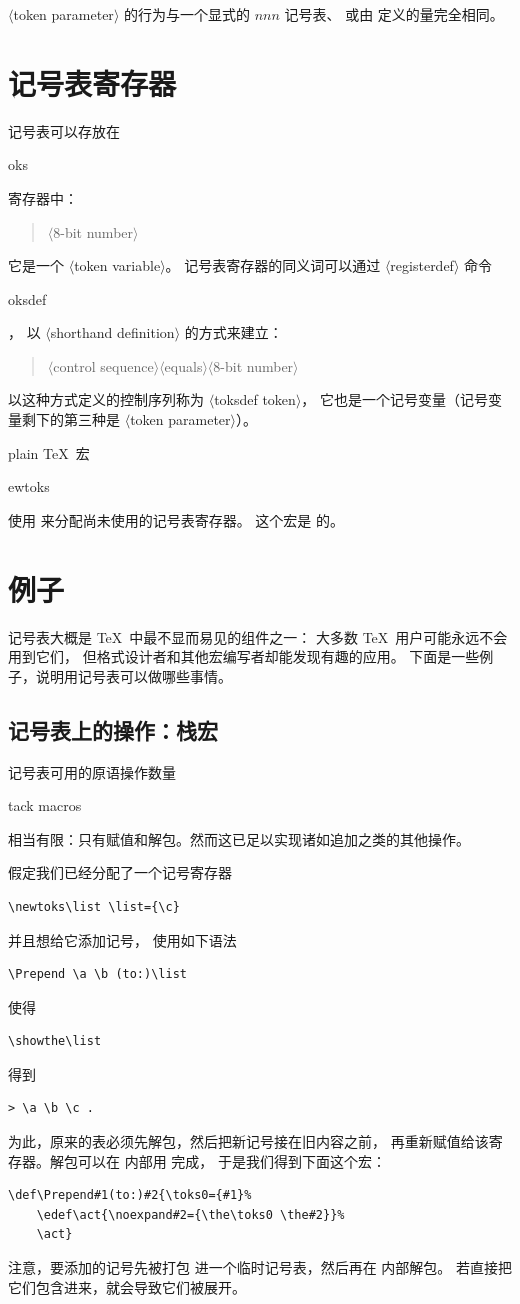 \documentclass[a4paper]{rapport3}
\makeatletter
\def\gr#1{$\langle$#1$\rangle$}\def\key#1{{\tt#1}}
\def\alt{}\def\altt{}%
\newenvironment{Disp}{\begin{quotation}}{\end{quotation}}
\def\howto#1\par{}
\def\cstoidx#1\par{\index{#1@\cs{#1}}}
\def\csidx#1{\cstoidx #1\par\cs{#1}}
\makeatother
\begin{document}
\gr{token parameter} 的行为与一个显式的 $nnn$ 记号表、
或由  定义的量完全相同。

\section{记号表寄存器}

记号表可以存放在 \csidx{toks} 寄存器中：
\begin{Disp}\gr{8-bit number}\end{Disp}
它是一个 \gr{token variable}。
记号表寄存器的同义词可以通过 \gr{registerdef} 命令 \csidx{toksdef}，
以 \gr{shorthand definition} 的方式来建立：
\begin{Disp}\gr{control sequence}\gr{equals}\gr{8-bit number}
\end{Disp} 以这种方式定义的控制序列称为 \gr{toksdef token}，
它也是一个记号变量（记号变量剩下的第三种是 \gr{token parameter}）。

plain \TeX\ 宏 \csidx{newtoks} 使用  来分配尚未使用的记号表寄存器。
这个宏是  的。

\section{例子}

记号表大概是 \TeX\ 中最不显而易见的组件之一：
大多数 \TeX\ 用户可能永远不会用到它们，
但格式设计者和其他宏编写者却能发现有趣的应用。
下面是一些例子，说明用记号表可以做哪些事情。

\subsection{记号表上的操作：栈宏}

记号表可用的原语操作数量\howto Stack macros\par
相当有限：只有赋值和解包。然而这已足以实现诸如追加之类的其他操作。

假定我们已经分配了一个记号寄存器
\begin{verbatim}
\newtoks\list \list={\c} 
\end{verbatim}
并且想给它添加记号，\alt
使用如下语法
\begin{verbatim}
\Prepend \a \b (to:)\list
\end{verbatim}
使得\begin{verbatim}
\showthe\list
\end{verbatim}
得到\begin{verbatim}
> \a \b \c .
\end{verbatim}
为此，原来的表必须先解包，然后把新记号接在旧内容之前，\alt
再重新赋值给该寄存器。解包可以在  内部用  完成，
于是我们得到下面这个宏：
\begin{verbatim}
\def\Prepend#1(to:)#2{\toks0={#1}%
    \edef\act{\noexpand#2={\the\toks0 \the#2}}%
    \act}
\end{verbatim}
注意，要添加的记号先被打包\alt
进一个临时记号表，然后再在  内部解包。
若直接把它们包含进来，就会导致它们被展开。
\end{document}
